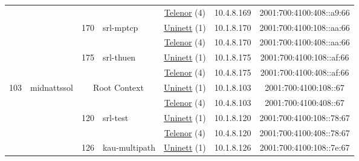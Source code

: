\begin{small}
\begin{center}
\begin{longtable}{|c|c|c|c|c|c|c|c|}
  &  &  &  & \multicolumn{2}{|c|}{\tiny{\href{https://www.telenor.no}{Telenor} (4)}} & \tiny{10.4.8.169} & \tiny{2001:700:4100:408::a9:66} \\* \cline{3-3}\cline{4-4}\cline{5-5}\cline{6-6}\cline{7-7}\cline{8-8}
  &  & \multirow{2}{*}{\tiny{170}} & \multicolumn{1}{|l|}{\multirow{2}{*}{\tiny{srl-mptcp}}} & \multicolumn{2}{|c|}{\tiny{\href{https://www.uninett.no}{Uninett} (1)}} & \tiny{10.1.8.170} & \tiny{2001:700:4100:108::aa:66} \\* \cline{5-5}\cline{6-6}\cline{7-7}\cline{8-8}
  &  &  &  & \multicolumn{2}{|c|}{\tiny{\href{https://www.telenor.no}{Telenor} (4)}} & \tiny{10.4.8.170} & \tiny{2001:700:4100:408::aa:66} \\* \cline{3-3}\cline{4-4}\cline{5-5}\cline{6-6}\cline{7-7}\cline{8-8}
  &  & \multirow{2}{*}{\tiny{175}} & \multicolumn{1}{|l|}{\multirow{2}{*}{\tiny{srl-thuen}}} & \multicolumn{2}{|c|}{\tiny{\href{https://www.uninett.no}{Uninett} (1)}} & \tiny{10.1.8.175} & \tiny{2001:700:4100:108::af:66} \\* \cline{5-5}\cline{6-6}\cline{7-7}\cline{8-8}
  &  &  &  & \multicolumn{2}{|c|}{\tiny{\href{https://www.telenor.no}{Telenor} (4)}} & \tiny{10.4.8.175} & \tiny{2001:700:4100:408::af:66} \\ \hline
 \multirow{18}{*}{\tiny{103}} & \multicolumn{1}{|l|}{\multirow{18}{*}{\tiny{midnattssol}}} & \multicolumn{2}{|c|}{\multirow{2}{*}{\tiny{Root Context}}} & \multicolumn{2}{|c|}{\tiny{\href{https://www.uninett.no}{Uninett} (1)}} & \tiny{10.1.8.103} & \tiny{2001:700:4100:108::67} \\* \cline{5-5}\cline{6-6}\cline{7-7}\cline{8-8}
  &  & \multicolumn{2}{|c|}{} & \multicolumn{2}{|c|}{\tiny{\href{https://www.telenor.no}{Telenor} (4)}} & \tiny{10.4.8.103} & \tiny{2001:700:4100:408::67} \\* \cline{3-3}\cline{4-4}\cline{5-5}\cline{6-6}\cline{7-7}\cline{8-8}
  &  & \multirow{2}{*}{\tiny{120}} & \multicolumn{1}{|l|}{\multirow{2}{*}{\tiny{srl-test}}} & \multicolumn{2}{|c|}{\tiny{\href{https://www.uninett.no}{Uninett} (1)}} & \tiny{10.1.8.120} & \tiny{2001:700:4100:108::78:67} \\* \cline{5-5}\cline{6-6}\cline{7-7}\cline{8-8}
  &  &  &  & \multicolumn{2}{|c|}{\tiny{\href{https://www.telenor.no}{Telenor} (4)}} & \tiny{10.4.8.120} & \tiny{2001:700:4100:408::78:67} \\* \cline{3-3}\cline{4-4}\cline{5-5}\cline{6-6}\cline{7-7}\cline{8-8}
  &  & \multirow{2}{*}{\tiny{126}} & \multicolumn{1}{|l|}{\multirow{2}{*}{\tiny{kau-multipath}}} & \multicolumn{2}{|c|}{\tiny{\href{https://www.uninett.no}{Uninett} (1)}} & \tiny{10.1.8.126} & \tiny{2001:700:4100:108::7e:67} \\* \cline{5-5}\cline{6-6}\cline{7-7}\cline{8-8}

\end{longtable}
\end{center}
\end{small}
